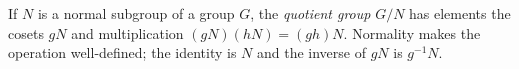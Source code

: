 
If $N$ is a normal subgroup of a group $G$, the \emph{quotient group} $G/N$ has elements the cosets $gN$ and multiplication $(gN)(hN)=(gh)N$. Normality makes the operation well-defined; the identity is $N$ and the inverse of $gN$ is $g^{-1}N$.
